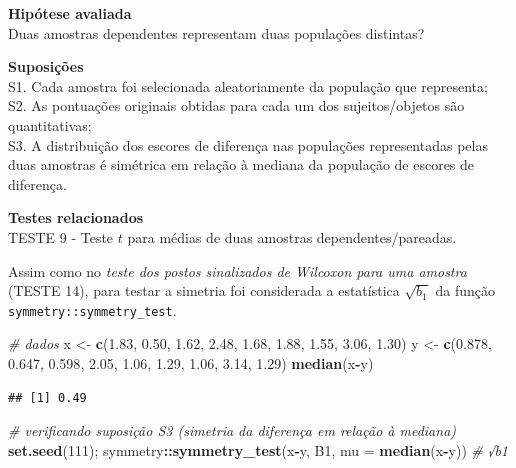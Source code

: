 \documentclass[
]{book}
\newenvironment{Shaded}{\begin{snugshade}}{\end{snugshade}}
\newcommand{\CommentTok}[1]{\textcolor[rgb]{0.56,0.35,0.01}{\textit{#1}}}
\newcommand{\DataTypeTok}[1]{\textcolor[rgb]{0.13,0.29,0.53}{#1}}
\newcommand{\DecValTok}[1]{\textcolor[rgb]{0.00,0.00,0.81}{#1}}
\newcommand{\FloatTok}[1]{\textcolor[rgb]{0.00,0.00,0.81}{#1}}
\newcommand{\KeywordTok}[1]{\textcolor[rgb]{0.13,0.29,0.53}{\textbf{#1}}}
\newcommand{\NormalTok}[1]{#1}
\newcommand{\OperatorTok}[1]{\textcolor[rgb]{0.81,0.36,0.00}{\textbf{#1}}}
\newcommand{\StringTok}[1]{\textcolor[rgb]{0.31,0.60,0.02}{#1}}
\theoremstyle{definition}
\theoremstyle{definition}
\theoremstyle{definition}
\theoremstyle{remark}
\begin{document}
\textbf{Hipótese avaliada}\\
Duas amostras dependentes representam duas populações distintas?

\textbf{Suposições}\\
S1. Cada amostra foi selecionada aleatoriamente da população que representa;\\
S2. As pontuações originais obtidas para cada um dos sujeitos/objetos são quantitativas;\\
S3. A distribuição dos escores de diferença nas populações representadas pelas duas amostras é simétrica em relação à mediana da população de escores de diferença.

\textbf{Testes relacionados}\\
TESTE 9 - Teste \(t\) para médias de duas amostras dependentes/pareadas.

Assim como no \emph{teste dos postos sinalizados de Wilcoxon para uma amostra} (TESTE 14), para testar a simetria foi considerada a estatística \(\sqrt{b_1}\) da função \texttt{symmetry::symmetry\_test}.

\begin{Shaded}
\begin{Highlighting}[]
\CommentTok{\# dados}
\NormalTok{x \textless{}{-}}\StringTok{ }\KeywordTok{c}\NormalTok{(}\FloatTok{1.83}\NormalTok{,  }\FloatTok{0.50}\NormalTok{,  }\FloatTok{1.62}\NormalTok{,  }\FloatTok{2.48}\NormalTok{, }\FloatTok{1.68}\NormalTok{, }\FloatTok{1.88}\NormalTok{, }\FloatTok{1.55}\NormalTok{, }\FloatTok{3.06}\NormalTok{, }\FloatTok{1.30}\NormalTok{)}
\NormalTok{y \textless{}{-}}\StringTok{ }\KeywordTok{c}\NormalTok{(}\FloatTok{0.878}\NormalTok{, }\FloatTok{0.647}\NormalTok{, }\FloatTok{0.598}\NormalTok{, }\FloatTok{2.05}\NormalTok{, }\FloatTok{1.06}\NormalTok{, }\FloatTok{1.29}\NormalTok{, }\FloatTok{1.06}\NormalTok{, }\FloatTok{3.14}\NormalTok{, }\FloatTok{1.29}\NormalTok{)}
\KeywordTok{median}\NormalTok{(x}\OperatorTok{{-}}\NormalTok{y)}
\end{Highlighting}
\end{Shaded}

\begin{verbatim}
## [1] 0.49
\end{verbatim}

\begin{Shaded}
\begin{Highlighting}[]
\CommentTok{\# verificando suposição S3 (simetria da diferença em relação à mediana)}
\KeywordTok{set.seed}\NormalTok{(}\DecValTok{111}\NormalTok{); symmetry}\OperatorTok{::}\KeywordTok{symmetry\_test}\NormalTok{(x}\OperatorTok{{-}}\NormalTok{y, }\StringTok{\textquotesingle{}B1\textquotesingle{}}\NormalTok{, }\DataTypeTok{mu =} \KeywordTok{median}\NormalTok{(x}\OperatorTok{{-}}\NormalTok{y))  }\CommentTok{\# √b1}
\end{Highlighting}
\end{Shaded}
\end{document}
